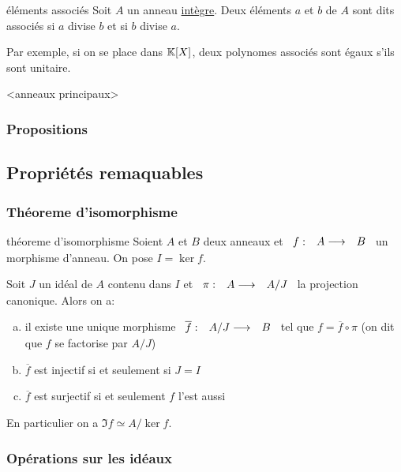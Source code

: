 \begin{definition}{éléments associés}{}
    Soit $A$ un anneau \underline{intègre}.
    Deux éléments $a$ et $b$ de $A$ sont dits associés si $a$ divise $b$ et si $b$ divise $a$.
\end{definition}

Par exemple, si on se place dans $\mathbb{K}[X]$, deux polynomes associés sont égaux s'ils sont unitaire.

<anneaux principaux>



\subsubsection{Propositions}


\subsection{Propriétés remaquables}

\subsubsection{Théoreme d'isomorphisme}

\begin{theorem}{théoreme d'isomorphisme}{}
    Soient $A$ et $B$ deux anneaux et $\begin{array}[t]{ccc}f : & A \longrightarrow & B\end{array}$ un morphisme d'anneau.
    On pose $I = \ker{f}$.

    Soit $J$ un idéal de $A$ contenu dans $I$ et $\begin{array}[t]{ccc}\pi : & A \longrightarrow & A/J\end{array}$ la projection canonique. Alors on a:
    \begin{enumerate}[(a)]
        \item il existe une unique morphisme $\begin{array}[t]{ccc}\overline{f} : & A/J \longrightarrow & B\end{array}$ tel que $f = \overline{f} \circ \pi$
                (on dit que $f$ se factorise par $A/J$)
        \item $\overline{f}$ est injectif si et seulement si $J = I$
        \item $\overline{f}$ est surjectif si et seulement $f$ l'est aussi
    \end{enumerate}

    En particulier on a $\Im{f} \simeq A/\ker{f}$.
\end{theorem}

\subsubsection{Opérations sur les idéaux}

